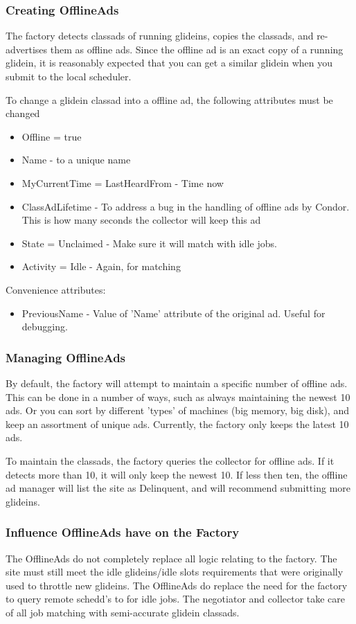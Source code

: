 \documentclass[11pt]{article}
\begin{document}
\subsubsection{Creating OfflineAds}
The factory detects classads of running glideins, copies the classads, and re-advertises them as offline ads. Since the offline ad is an exact copy of a running glidein, it is reasonably expected that you can get a similar glidein when you submit to the local scheduler.

To change a glidein classad into a offline ad, the following attributes must be changed

\begin{itemize}
\item Offline = true
\item Name - to a unique name
\item MyCurrentTime = LastHeardFrom - Time now
\item ClassAdLifetime - To address a bug in the handling of offline ads by Condor. This is how many seconds the collector will keep this ad
\item State = Unclaimed - Make sure it will match with idle jobs.
\item Activity = Idle - Again, for matching 
\end{itemize}

Convenience attributes: 
\begin{itemize}
\item PreviousName - Value of 'Name' attribute of the original ad. Useful for debugging. 
\end{itemize}

\subsubsection{Managing OfflineAds}
By default, the factory will attempt to maintain a specific number of offline ads. This can be done in a number of ways, such as always maintaining the newest 10 ads. Or you can sort by different 'types' of machines (big memory, big disk), and keep an assortment of unique ads.  Currently, the factory only keeps the latest 10 ads.

To maintain the classads, the factory queries the collector for offline ads. If it detects more than 10, it will only keep the newest 10. If less then ten, the offline ad manager will list the site as Delinquent, and will recommend submitting more glideins.

\subsubsection{Influence OfflineAds have on the Factory}
The OfflineAds do not completely replace all logic relating to the factory. The site must still meet the idle glideins/idle slots requirements that were originally used to throttle new glideins. The OfflineAds do replace the need for the factory to query remote schedd's to for idle jobs. The negotiator and collector take care of all job matching with semi-accurate glidein classads.
\end{document}
